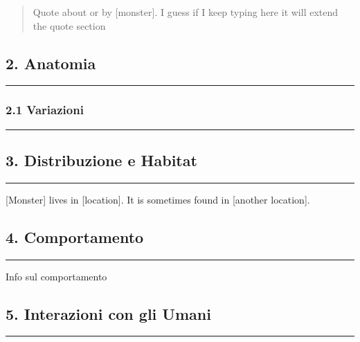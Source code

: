 \begin{quote}
Quote about or by {[}monster{]}. I guess if I keep typing here it will
extend the quote section
\end{quote}

\subsection{2. Anatomia}\label{anatomia}

\begin{center}\rule{0.5\linewidth}{0.5pt}\end{center}

\subsubsection{2.1 Variazioni}\label{variazioni}

\begin{center}\rule{0.5\linewidth}{0.5pt}\end{center}

\subsection{3. Distribuzione e Habitat}\label{distribuzione-e-habitat}

\begin{center}\rule{0.5\linewidth}{0.5pt}\end{center}

{[}Monster{]} lives in {[}location{]}. It is sometimes found in
{[}another location{]}.

\subsection{4. Comportamento}\label{comportamento}

\begin{center}\rule{0.5\linewidth}{0.5pt}\end{center}

Info sul comportamento

\subsection{5. Interazioni con gli
Umani}\label{interazioni-con-gli-umani}

\begin{center}\rule{0.5\linewidth}{0.5pt}\end{center}

